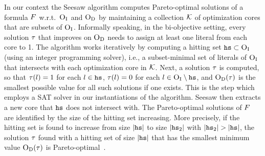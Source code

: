 In our context the Seesaw algorithm computes Pareto-optimal solutions of a formula $F$ w.r.t.\ $\textsc{O}_{\text{I}}$ and $\textsc{O}_{\text{D}}$ by maintaining a collection $\mathcal{K}$ of optimization cores that are subsets of $\textsc{O}_{\text{I}}$.
Informally speaking, in the bi-objective setting, every solution $\tau$ that improves on $\textsc{O}_{\text{D}}$ needs to assign at least one literal from each core to 1.
The algorithm works iteratively by computing a hitting set $\texttt{hs} \subset \textsc{O}_{\text{I}}$ (using an integer programming solver), i.e., a subset-minimal set of literals of $\textsc{O}_{\text{I}}$ that intersects with each optimization core in $\mathcal{K}$.
Next, a solution $\tau$ is computed, so that $\tau(l) = 1$ for each $l \in \texttt{hs}$, $\tau(l) = 0$ for each $l \in \textsc{O}_{\text{I}} \setminus \texttt{hs}$, and $\textsc{O}_{\text{D}}(\tau)$ is the smallest possible value for all such solutions if one exists.
This is the step which employs a SAT solver in our instantiations of the algorithm.
Seesaw then extracts a new core that $\texttt{hs}$ does not intersect with.
The Pareto-optimal solutions of $F$ are identified by the size of the hitting set increasing.
More precisely, if the hitting set is found to increase from size $|\texttt{hs}|$ to size $|\texttt{hs}_2|$ with $|\hs_2|>|\hs|$, the solution $\tau$ found with a hitting set of size $|\texttt{hs}|$ that has the smallest minimum value $\textsc{O}_{\text{D}}(\tau)$ is Pareto-optimal~\autocite{DBLP:conf/cp/JanotaMSM21}.

